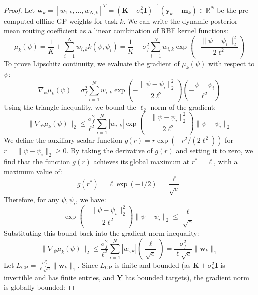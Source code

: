 \documentclass{article}
\theoremstyle{plain}
\theoremstyle{definition}
\theoremstyle{remark}
\begin{document}
\begin{proof}
Let $\mathbf{w}_k = [w_{1, k}, \dots, w_{N, k}]^T = \left( \mathbf{K} + \sigma_n^2 \mathbf{I} \right)^{-1} \left( \mathbf{y}_k - \mathbf{m}_k \right) \in \mathbb{R}^N$ be the pre-computed offline GP weights for task $k$. We can write the dynamic posterior mean routing coefficient as a linear combination of RBF kernel functions:
\begin{equation}
\mu_k(\psi) = \frac{1}{K} + \sum_{i=1}^N w_{i, k} k(\psi, \psi_i) = \frac{1}{K} + \sigma_f^2 \sum_{i=1}^N w_{i, k} \exp\left( -\frac{\|\psi - \psi_i\|_2^2}{2 \ell^2} \right)
\end{equation}
To prove Lipschitz continuity, we evaluate the gradient of $\mu_k(\psi)$ with respect to $\psi$:
\begin{equation}
\nabla_{\psi} \mu_k(\psi) = \sigma_f^2 \sum_{i=1}^N w_{i, k} \exp\left( -\frac{\|\psi - \psi_i\|_2^2}{2 \ell^2} \right) \left( -\frac{\psi - \psi_i}{\ell^2} \right)
\end{equation}
Using the triangle inequality, we bound the $\ell_2$-norm of the gradient:
\begin{equation}
\|\nabla_{\psi} \mu_k(\psi)\|_2 \le \frac{\sigma_f^2}{\ell^2} \sum_{i=1}^N |w_{i, k}| \exp\left( -\frac{\|\psi - \psi_i\|_2^2}{2 \ell^2} \right) \|\psi - \psi_i\|_2
\end{equation}
We define the auxiliary scalar function $g(r) = r \exp(-r^2 / (2 \ell^2))$ for $r = \|\psi - \psi_i\|_2 \ge 0$. By taking the derivative of $g(r)$ and setting it to zero, we find that the function $g(r)$ achieves its global maximum at $r^* = \ell$, with a maximum value of:
\begin{equation}
g(r^*) = \ell \exp(-1/2) = \frac{\ell}{\sqrt{e}}
\end{equation}
Therefore, for any $\psi, \psi_i$, we have:
\begin{equation}
\exp\left( -\frac{\|\psi - \psi_i\|_2^2}{2 \ell^2} \right) \|\psi - \psi_i\|_2 \le \frac{\ell}{\sqrt{e}}
\end{equation}
Substituting this bound back into the gradient norm inequality:
\begin{equation}
\|\nabla_{\psi} \mu_k(\psi)\|_2 \le \frac{\sigma_f^2}{\ell^2} \sum_{i=1}^N |w_{i, k}| \left( \frac{\ell}{\sqrt{e}} \right) = \frac{\sigma_f^2}{\ell \sqrt{e}} \|\mathbf{w}_k\|_1
\end{equation}
Let $L_{\text{GP}} = \frac{\sigma_f^2}{\ell \sqrt{e}} \|\mathbf{w}_k\|_1$. Since $L_{\text{GP}}$ is finite and bounded (as $\mathbf{K} + \sigma_n^2 \mathbf{I}$ is invertible and has finite entries, and $\mathbf{Y}$ has bounded targets), the gradient norm is globally bounded:

\end{proof}
\end{document}
